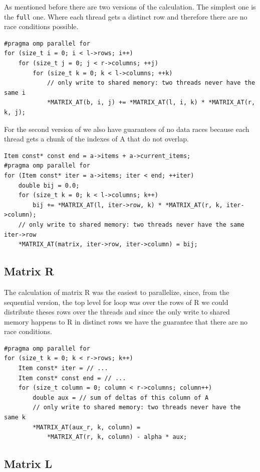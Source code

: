 \documentclass[a4paper]{article}
\begin{document}
As mentioned before there are two versions of the calculation. The simplest one
is the \texttt{full} one. Where each thread gets a distinct row and therefore
there are no race conditions possible.
\begin{verbatim}
#pragma omp parallel for
for (size_t i = 0; i < l->rows; i++)
    for (size_t j = 0; j < r->columns; ++j)
        for (size_t k = 0; k < l->columns; ++k)
            // only write to shared memory: two threads never have the same i
            *MATRIX_AT(b, i, j) += *MATRIX_AT(l, i, k) * *MATRIX_AT(r, k, j);
\end{verbatim}

For the second version of we also have guarantees of no data races because each
thread gets a chunk of the indexes of A that do not overlap.
\begin{verbatim}
Item const* const end = a->items + a->current_items;
#pragma omp parallel for
for (Item const* iter = a->items; iter < end; ++iter)
    double bij = 0.0;
    for (size_t k = 0; k < l->columns; k++)
        bij += *MATRIX_AT(l, iter->row, k) * *MATRIX_AT(r, k, iter->column);
    // only write to shared memory: two threads never have the same iter->row
    *MATRIX_AT(matrix, iter->row, iter->column) = bij;
\end{verbatim}

\subsection{Matrix R}

The calculation of matrix R was the easiest to parallelize, since, from the
sequential version, the top level for loop was over the rows of R we could
distribute theses rows over the threads and since the only write to shared
memory happens to R in distinct rows we have the guarantee that there are no
race conditions.

\begin{verbatim}
#pragma omp parallel for
for (size_t k = 0; k < r->rows; k++)
    Item const* iter = // ...
    Item const* const end = // ...
    for (size_t column = 0; column < r->columns; column++)
        double aux = // sum of deltas of this column of A
        // only write to shared memory: two threads never have the same k
        *MATRIX_AT(aux_r, k, column) =
            *MATRIX_AT(r, k, column) - alpha * aux;
\end{verbatim}

\subsection{Matrix L}
\end{document}
